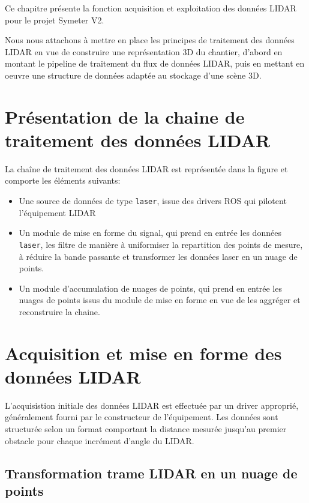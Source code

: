 \documentclass[12pt,a4paper]{report}
\begin{document}
Ce chapitre présente la fonction acquisition et exploitation des données LIDAR pour le projet Symeter V2. 

\para Nous nous attachons à mettre en place les principes de traitement des données LIDAR en vue de construire une représentation 3D du chantier, d'abord en montant le pipeline de traitement du flux de données LIDAR, puis en mettant en oeuvre une structure de données adaptée au stockage d'une scène 3D.

	\section{Présentation de la chaine de traitement des données LIDAR}
	
	La chaîne de traitement des données LIDAR est représentée dans la figure  et comporte les éléments suivants:
	\begin{itemize}
		\item Une source de données de type \verb|laser|, issue des drivers ROS qui pilotent l'équipement LIDAR
		
		\item Un module de mise en forme du signal, qui prend en entrée les données \verb|laser|, les filtre de manière à uniformiser la repartition des points de mesure, à réduire la bande passante et transformer les données laser en un nuage de points.
		
		\item Un module d'accumulation de nuages de points, qui prend en entrée les nuages de points issus du module de mise en forme en vue de les aggréger et reconstruire la chaine.
	\end{itemize}
	
	
	\section{Acquisition et mise en forme des données LIDAR}
	L'acquisistion initiale des données LIDAR est effectuée par un driver approprié, généralement fourni par le constructeur de l'équipement. Les données sont structurée selon un format comportant la distance mesurée jusqu'au premier obstacle pour chaque incrément d'angle du LIDAR.

	
		\subsection{Transformation trame LIDAR en un nuage de points}
	
\end{document}
